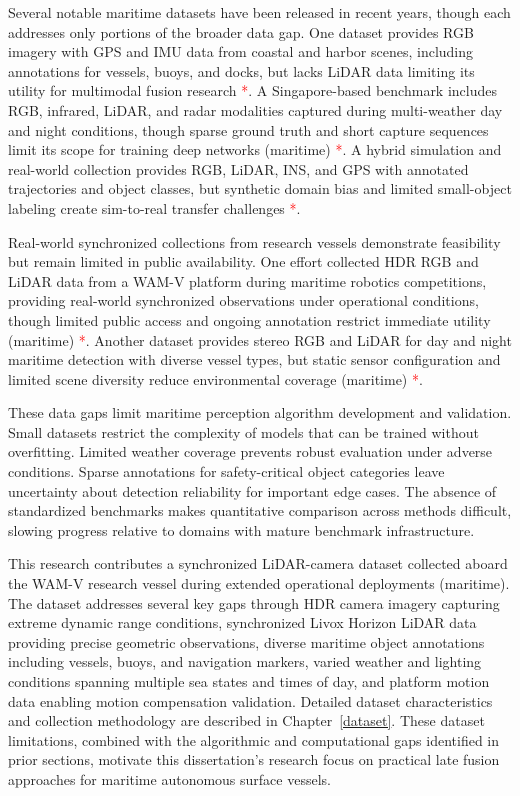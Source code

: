 \documentclass[../main.tex]{subfiles}
\begin{document}
Several notable maritime datasets have been released in recent years, though each addresses only portions of the broader data gap. One dataset provides RGB imagery with GPS and IMU data from coastal and harbor scenes, including annotations for vessels, buoys, and docks, but lacks LiDAR data limiting its utility for multimodal fusion research \textcolor{red}{*}. A Singapore-based benchmark includes RGB, infrared, LiDAR, and radar modalities captured during multi-weather day and night conditions, though sparse ground truth and short capture sequences limit its scope for training deep networks (maritime) \textcolor{red}{*}. A hybrid simulation and real-world collection provides RGB, LiDAR, INS, and GPS with annotated trajectories and object classes, but synthetic domain bias and limited small-object labeling create sim-to-real transfer challenges \textcolor{red}{*}.

Real-world synchronized collections from research vessels demonstrate feasibility but remain limited in public availability. One effort collected HDR RGB and LiDAR data from a WAM-V platform during maritime robotics competitions, providing real-world synchronized observations under operational conditions, though limited public access and ongoing annotation restrict immediate utility (maritime) \textcolor{red}{*}. Another dataset provides stereo RGB and LiDAR for day and night maritime detection with diverse vessel types, but static sensor configuration and limited scene diversity reduce environmental coverage (maritime) \textcolor{red}{*}.

These data gaps limit maritime perception algorithm development and validation. Small datasets restrict the complexity of models that can be trained without overfitting. Limited weather coverage prevents robust evaluation under adverse conditions. Sparse annotations for safety-critical object categories leave uncertainty about detection reliability for important edge cases. The absence of standardized benchmarks makes quantitative comparison across methods difficult, slowing progress relative to domains with mature benchmark infrastructure.

This research contributes a synchronized LiDAR-camera dataset collected aboard the WAM-V research vessel during extended operational deployments (maritime). The dataset addresses several key gaps through HDR camera imagery capturing extreme dynamic range conditions, synchronized Livox Horizon LiDAR data providing precise geometric observations, diverse maritime object annotations including vessels, buoys, and navigation markers, varied weather and lighting conditions spanning multiple sea states and times of day, and platform motion data enabling motion compensation validation. Detailed dataset characteristics and collection methodology are described in Chapter~\ref{dataset}. These dataset limitations, combined with the algorithmic and computational gaps identified in prior sections, motivate this dissertation's research focus on practical late fusion approaches for maritime autonomous surface vessels.
\end{document}
